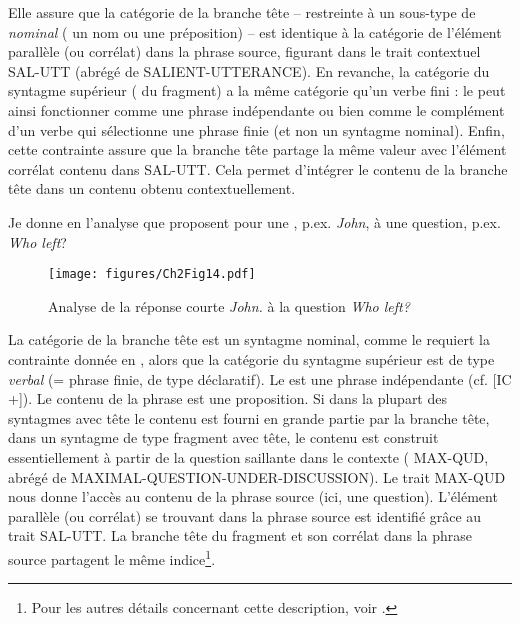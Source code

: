 \z

Elle assure que la catégorie de la branche tête – restreinte à un sous-type de \textit{nominal} ({\cad} un nom ou une préposition) – est identique à la catégorie de l’élément parallèle (ou corrélat) dans la phrase source, figurant dans le trait contextuel SAL-UTT (abrégé de SALIENT-UTTERANCE). En revanche, la catégorie du syntagme supérieur ({\cad} du fragment) a la même catégorie qu’un verbe fini : le  peut ainsi fonctionner comme une phrase indépendante ou bien comme le complément d’un verbe qui sélectionne une phrase finie (et non un syntagme nominal). Enfin, cette contrainte assure que la branche tête partage la même valeur avec l’élément corrélat contenu dans SAL-UTT. Cela permet d’intégrer le contenu de la branche tête dans un contenu obtenu contextuellement. 

Je donne en  l’analyse que \citet{GinzburgEtAl2000} proposent pour une , p.ex. \textit{John}, à une question, p.ex. \textit{Who left}? 

\begin{figure} 

   \texttt{[image: figures/Ch2Fig14.pdf]}

\caption{Analyse de la réponse courte \textit{John.} à la question \textit{Who left?}}
\label{ch2:fig14}
\end{figure}

La catégorie de la branche tête est un syntagme nominal, comme le requiert la contrainte donnée en , alors que la catégorie du syntagme supérieur est de type \textit{verbal} (= phrase finie, de type déclaratif). Le  est une phrase indépendante (cf. [IC +]). Le contenu de la phrase est une proposition. Si dans la plupart des syntagmes avec tête le contenu est fourni en grande partie par la branche tête, dans un syntagme de type fragment avec tête, le contenu est construit essentiellement à partir de la question saillante dans le contexte ({\cad} MAX-QUD, abrégé de MAXIMAL-QUESTION-UNDER-DISCUSSION). Le trait MAX-QUD nous donne l’accès au contenu de la phrase source (ici, une question). L’élément parallèle (ou corrélat) se trouvant dans la phrase source est identifié grâce au trait SAL-UTT. La branche tête du fragment et son corrélat dans la phrase source partagent le même indice\footnote{Pour les autres détails concernant cette description, voir \citet[chapitre 8, section 8.1.4]{GinzburgEtAl2000}.}.

